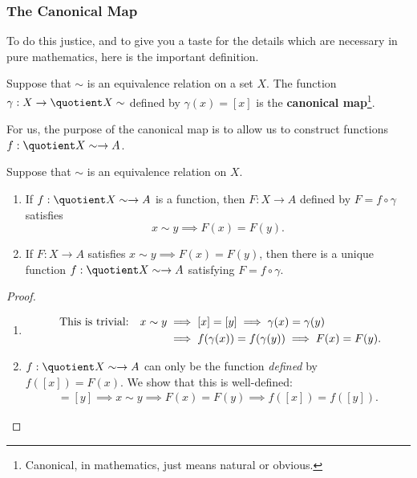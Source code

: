 \subsubsection*{\bf The Canonical Map}

To do this justice, and to give you a taste for the details which are necessary in pure mathematics, here is the important definition.

\begin{defn}
Suppose that $\sim$ is an equivalence relation on a set $X$. The function $\gamma:X\to \quotient X\sim$ defined by $\gamma(x)=[x]$ is the \textbf{canonical map}\footnote{Canonical, in mathematics, just means natural or obvious.}.
\end{defn}

\noindent For us, the purpose of the canonical map is to allow us to construct functions $f:\quotient X\sim\to A$.

\begin{thm}\label{thm:firstiso}
Suppose that $\sim$ is an equivalence relation on $X$.
\begin{enumerate}
  \item If $f:\quotient X\sim\to A$ is a function, then $F:X\to A$ defined by $F=f\circ\gamma$ satisfies
  \[x\sim y\implies F(x)=F(y).\]
  \item If $F:X\to A$ satisfies $x\sim y\implies F(x)=F(y)$, then there is a unique function $f:\quotient X\sim\to A$ satisfying $F=f\circ\gamma$.
\end{enumerate}
\end{thm}

\begin{proof}
\begin{enumerate}
  \item\preinitdisp\begin{align*}
	\hspace{4.3pt}\text{This is trivial:}\quad x\sim y&\implies [x]=[y]\implies \gamma(x)=\gamma(y)\\
	&\implies f(\gamma(x))=f(\gamma(y))\implies F(x)=F(y).
	\end{align*}\postinitdisp
	\item $f:\quotient X\sim\to A$ can only be the function \emph{defined} by $f([x])=F(x)$. We show that this is well-defined:
	\begin{gather*}
	[x]=[y]\implies x\sim y\implies F(x)=F(y)\implies f([x])=f([y]).\tag*{\qedhere}
	\end{gather*}
\end{enumerate}
\end{proof}

